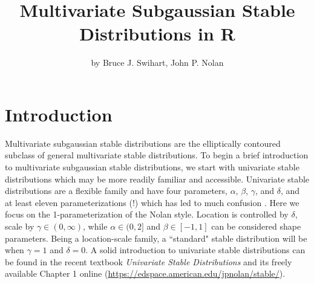 \title{Multivariate Subgaussian Stable Distributions in R}
\author{by Bruce J. Swihart, John P. Nolan}

\maketitle


\section{Introduction}



Multivariate subgaussian stable distributions are the elliptically
contoured subclass of general multivariate stable distributions.  To
begin a brief introduction to multivariate subgaussian stable
distributions, we start with univariate stable distributions which may
be more readily familiar and accessible. Univariate stable
distributions are a flexible family and have four parameters,
$\alpha$, $\beta$, $\gamma$, and $\delta$, and at least eleven
parameterizations (!)  which has led to much confusion
\citep{nolan2020univariate}.  Here we focus on the 1-parameterization
of the Nolan style. Location is controlled by $\delta$, scale by
$\gamma \in (0,\infty)$, while $\alpha \in (0,2]$ and
$\beta \in [-1,1]$ can be considered shape parameters.  Being a
location-scale family, a ``standard" stable distribution will be when
$\gamma=1$ and $\delta=0$. A solid introduction to univariate stable
distributions can be found in the recent textbook \emph{Univariate
  Stable Distributions} \citep{nolan2020univariate} and its freely
available Chapter 1 online
(\url{https://edspace.american.edu/jpnolan/stable/}).

